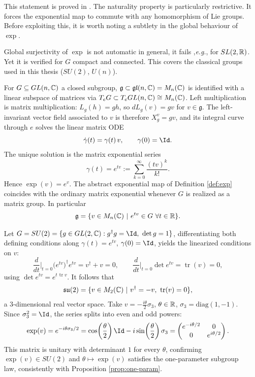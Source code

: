 This statement is proved in \cite[Proposition 20.8]{leeIntroductionSmoothManifolds2013}. The naturality property is particularly restrictive. It forces the exponential map to commute with any homomorphism of Lie groups. Before exploiting this, it is worth noting a subtlety in the global behaviour of $\exp$.

\begin{remark}
	Global surjectivity of $\exp$ is not automatic in general, it fails ,\textit{e.g.}, for $SL(2,\mathbb{R})$. Yet it is verified for $G$ compact and connected. This covers the classical groups used in this thesis ($SU(2)$, $U(n)$).
\end{remark}

\begin{remark}
	For $G \subseteq GL(n,\mathbb{C})$ a closed subgroup, $\mathfrak g \subset \mathfrak{gl}(n,\mathbb{C}) = M_n(\mathbb{C})$ is identified with a linear subspace of matrices via $T_eG \subset T_eGL(n,\mathbb{C}) \cong M_n(\mathbb{C})$. Left multiplication is matrix multiplication: $L_g(h) = gh$, so $dL_g(v) = gv$ for $v \in \mathfrak g$. The left-invariant vector field associated to $v$ is therefore $X^v_g = gv$, and its integral curve through $e$ solves the linear matrix ODE
	\[
	\dot\gamma(t) = \gamma(t)\, v, \qquad \gamma(0) = \Id.
	\]
	The unique solution is the matrix exponential series
	\[
	\gamma(t) = e^{tv} := \sum_{k=0}^\infty \frac{(tv)^k}{k!}.
	\]
	Hence $\exp(v) = e^{v}$. The abstract exponential map of Definition \ref{def:exp} coincides with the ordinary matrix exponential whenever $G$ is realized as a matrix group. In particular
	\[
	\mathfrak g = \{v \in M_n(\mathbb{C}) \ | \ e^{tv} \in G \ \forall t \in \mathbb{R}\}.
	\]
\end{remark}

\begin{example}
	Let $G = SU(2) = \{g \in GL(2,\C) : g^\dagger g = \Id,\ \det g = 1\}$, differentiating both defining conditions along $\gamma(t) = e^{tv}$, $\gamma(0)= \Id$, yields the linearized conditions on $v$:
	\[
	\frac{d}{dt}\Big|_{t=0} \big(e^{tv}\big)^\dagger e^{tv} = v^\dagger + v = 0, \qquad
	\frac{d}{dt}\Big|_{t=0} \det e^{tv} = \operatorname{tr}(v) = 0,
	\]
	using $\det e^{tv} = e^{t\,\operatorname{tr} v}$. It follows that
	\[
	\mathfrak{su}(2) = \{v \in M_2(\mathbb{C}) \ | \ v^\dagger = -v,\ \operatorname{tr}(v) = 0\},
	\]
	a $3$-dimensional real vector space. Take $v = -\tfrac{i\theta}{2}\sigma_3$, $\theta \in \mathbb{R}$, $\sigma_3 = \mathrm{diag}(1,-1)$. Since $\sigma_3^2 = \Id$, the series splits into even and odd powers:
	\[
	\exp(v) = e^{-i\theta\sigma_3/2} = \cos\!\left(\frac{\theta}{2}\right) \Id - i\sin\!\left(\frac{\theta}{2}\right)\sigma_3
	= \begin{pmatrix} e^{-i\theta/2} & 0 \\ 0 & e^{i\theta/2} \end{pmatrix}.
	\]
	This matrix is unitary with determinant $1$ for every $\theta$, confirming $\exp(v) \in SU(2)$ and $\theta \mapsto \exp(v)$ satisfies the one-parameter subgroup law, consistently with Proposition \ref{prop:one-param}. 
\end{example}


